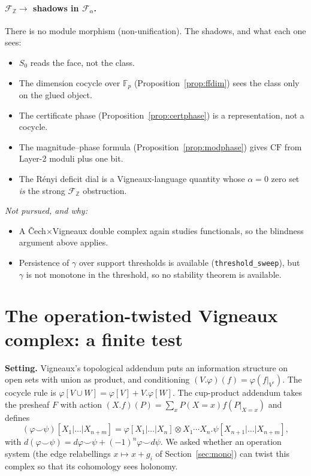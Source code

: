 \documentclass[11pt]{article}
\theoremstyle{definition}
\theoremstyle{remark}
\newcommand{\Z}{\mathbb{Z}}
\newcommand{\F}{\mathbb{F}}
\newcommand{\CF}{\mathrm{CF}}
\begin{document}
\paragraph{$\mathcal F_{\Z}\to$ shadows in $\mathcal F_\alpha$.} There is no module morphism (non-unification). The shadows, and what each one sees:
\begin{itemize}
  \item $S_0$ reads the face, not the class.
  \item The dimension cocycle over $\F_p$ (Proposition~\ref{prop:ffdim}) sees the class only on the glued object.
  \item The certificate phase (Proposition~\ref{prop:certphase}) is a representation, not a cocycle.
  \item The magnitude--phase formula (Proposition~\ref{prop:modphase}) gives $\CF$ from Layer-2 moduli plus one bit.
  \item The R\'enyi deficit dial is a Vigneaux-language quantity whose $\alpha=0$ zero set \emph{is} the strong $\mathcal F_{\Z}$ obstruction.
\end{itemize}
\emph{Not pursued, and why:}
\begin{itemize}
  \item A \v{C}ech$\times$Vigneaux double complex again studies functionals, so the blindness argument above applies.
  \item Persistence of $\gamma$ over support thresholds is available (\texttt{threshold\_sweep}), but $\gamma$ is not monotone in the threshold, so no stability theorem is available.
\end{itemize}

\section{The operation-twisted Vigneaux complex: a finite test}\label{sec:twisted}
\textbf{Setting.} Vigneaux's topological addendum puts an information structure on open sets with union as product, and conditioning $(V.\varphi)(f)=\varphi(f|_{V^c})$. The cocycle rule is $\varphi[V\cup W]=\varphi[V]+V.\varphi[W]$. The cup-product addendum takes the presheaf $F$ with action $(X.f)(P)=\sum_x P(X{=}x)f(P|_{X=x})$ and defines
\[
(\varphi\smile\psi)[X_1|\dots|X_{n+m}]=\varphi[X_1|\dots|X_n]\otimes X_1\cdots X_n.\psi[X_{n+1}|\dots|X_{n+m}],
\]
with $d(\varphi\smile\psi)=d\varphi\smile\psi+(-1)^n\varphi\smile d\psi$. We asked whether an operation system (the edge relabellings $x\mapsto x+g_i$ of Section~\ref{sec:mono}) can twist this complex so that its cohomology sees holonomy.
\end{document}
